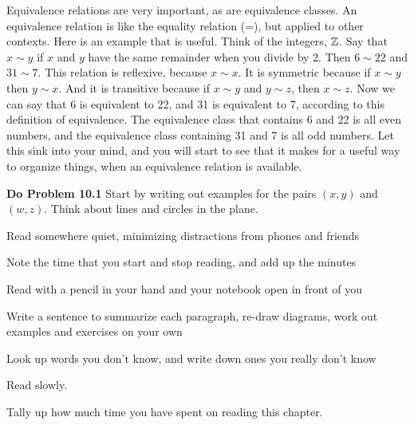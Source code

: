 Equivalence relations are very important, as are equivalence classes.
An equivalence relation is like the equality relation (=), but applied to other contexts.
Here is an example that is useful.
Think of the integers, $\mathbb{Z}$.
Say that $x \sim y$ if $x$ and $y$ have the same remainder when you divide by 2.
Then $6 \sim 22$ and $31 \sim 7$.
This relation is reflexive, because $x \sim x$.
It is symmetric because if $x \sim y$ then $y \sim x$.
And it is transitive because if $x \sim y$ and $y \sim z$, then $x \sim z$.
Now we can say that 6 is equivalent to 22, and 31 is equivalent to 7, according to this definition of equivalence.
The equivalence class that contains 6 and 22 is all even numbers, and the equivalence class containing 31 and 7 is all odd numbers.
Let this sink into your mind, and you will start to see that it makes for a useful way to organize things, when an equivalence relation is available.

{\bf Do Problem 10.1}  Start by writing out examples for the pairs $(x,y)$ and $(w,z)$.  Think about lines and circles in the plane.

{\tiny 
\blist{0.0in}
\item Read somewhere quiet, minimizing distractions from phones and friends
\item Note the time that you start and stop reading, and add up the minutes
\item Read with a pencil in your hand and your notebook open in front of you
\item Write a sentence to summarize each paragraph, re-draw diagrams, work out examples and exercises on your own
\item Look up words you don't know, and write down ones you really don't know
\item Read slowly. 
\item Tally up how much time you have spent on reading this chapter.
\elist
}
\vfill          %
